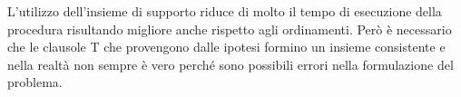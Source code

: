 \documentclass[a4paper,11pt]{article} %
\newcommand{\campo}{\texttt}
\begin{document}

L'utilizzo dell'insieme di supporto riduce di molto il tempo di esecuzione
della procedura%
risultando migliore anche rispetto agli ordinamenti. Però
è necessario che le clausole T che provengono dalle ipotesi
formino un insieme consistente e nella realtà non sempre è
vero perché sono possibili errori nella formulazione del problema.

\end{document}
